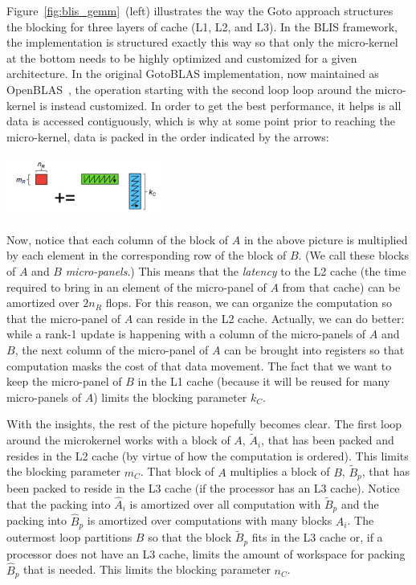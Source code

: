 Figure~\ref{fig:blis_gemm}~(left) illustrates the way the Goto approach structures the blocking for three layers of cache (L1, L2, and L3).  In the BLIS framework, the implementation is structured exactly this way so that only the micro-kernel at the bottom needs to be highly optimized and customized for a given architecture.  In the original GotoBLAS implementation, now maintained as OpenBLAS~\cite{}, the operation starting with the second loop loop around the micro-kernel is instead customized.  In order to get the best performance, it helps is all data is accessed contiguously, which is why at some point prior to reaching the micro-kernel, data is packed in the order indicated by the arrows:
\begin{center}
	\includegraphics[width=2in]{figures/microkernel.pdf}
\end{center}
Now, notice that each column of the block of $ A $ in the above picture is multiplied by each element in the corresponding row of the block of $ B $.  (We call these blocks of $ A $ and $ B $ {\em micro-panels}.)  This means that the {\em latency} to the L2 cache (the time required to bring in an element of the micro-panel of $ A $ from that cache) can be amortized over $ 2n_R $ flops.  For this reason, we can organize the computation so that the micro-panel of $ A $ can reside in the L2 cache.  Actually, we can do better: while a rank-1 update is happening with a column of the micro-panels of $ A $ and $ B $, the next column of the micro-panel of $ A $ can be brought into registers so that computation masks the cost of that data movement.
The fact that we want to keep the micro-panel of $ B $ in the L1 cache (because it will be reused for many micro-panels of $ A $) limits the blocking parameter $ k_C $.

With the insights, the rest of the picture hopefully becomes clear.
The first loop around the microkernel works with a block of $ A $, $ \widetilde A_i $, that has been packed and resides in the L2 cache (by virtue of how the computation is ordered).  This limits the blocking parameter $ m_C $.  That block of $ A $ multiplies a block of $ B $, $ \widetilde B_p $, that has been packed to reside in the L3 cache (if the processor has an L3 cache).  Notice that the packing into  $ \widehat A_i $ is amortized over all computation  with $ \widetilde B_p $ and the packing into $ \widehat B_p $ is amortized over computations with many blocks $ A_i $.  The outermost loop partitions $ B $ so that the block $ \widetilde B_p $ fits in the L3 cache or, if a processor does not have an L3 cache, limits the amount of workspace for packing $ \widehat B_p $ that is needed.  This limits the blocking parameter $ n_C $.

